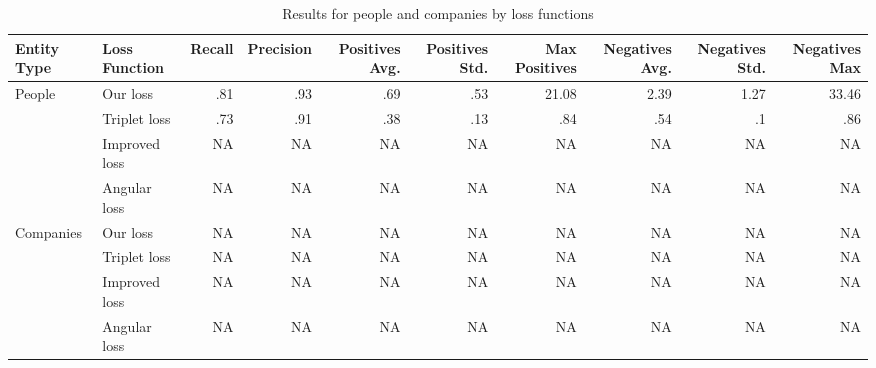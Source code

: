 \begin{table}[ht]
\caption{Results for people and companies by loss functions}
\label{Evaluation}
\begin{tabular}{l|l|r|r|r|r|r|r|r|r|}
\hline
Entity Type & Loss Function & Recall & Precision & Positives Avg. & Positives Std. & Max Positives & Negatives Avg. & Negatives Std. & Negatives Max \\
\hline
\multirow{4}{*}{People} & Our loss & .81 & .93 & .69 & .53 & 21.08 & 2.39 & 1.27 & 33.46 \\
\hline
& Triplet loss & .73 & .91 & .38 & .13 & .84 & .54 & .1 & .86 \\
\hline
& Improved loss & NA & NA & NA & NA & NA & NA & NA & NA \\
\hline
& Angular loss & NA & NA & NA & NA & NA & NA & NA & NA \\
\hline
\multirow{4}{*}{Companies} & Our loss & NA & NA & NA & NA & NA & NA & NA & NA \\
& Triplet loss & NA & NA & NA & NA & NA & NA & NA & NA \\
\hline
& Improved loss & NA & NA & NA & NA & NA & NA & NA & NA \\
\hline
& Angular loss & NA & NA & NA & NA & NA & NA & NA & NA \\
\hline
\end{tabular}
\end{table}

